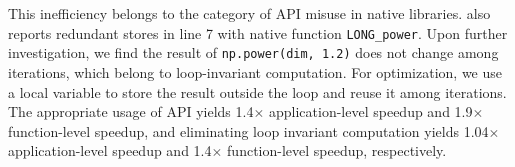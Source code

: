 This inefficiency belongs to the category of API misuse in native libraries. \tool also reports redundant stores in line 7 with native function {\tt LONG\_power}. Upon further investigation, we find the result of {\tt np.power(dim, 1.2)} does not change among iterations, which belong to loop-invariant computation. For optimization, we use a local variable to store the result outside the loop and reuse it among iterations. The appropriate usage of API yields 1.4$\times$ application-level speedup and 1.9$\times$ function-level speedup, and eliminating loop invariant computation yields 1.04$\times$ application-level speedup and 1.4$\times$ function-level speedup, respectively.




















